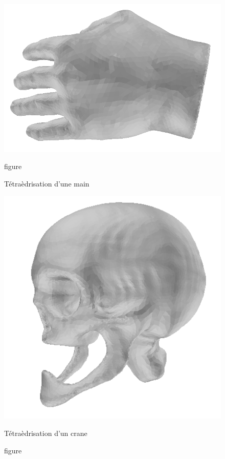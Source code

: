 \documentclass[a4paper,11pt,openany]{article}
\begin{document}
\begin{figure}[H]
\centering
\begin{minipage}{.5\textwidth}
  \centering
  \includegraphics[scale=0.2]{Images/hand}
  \caption{figure}{Tétraèdrisation d'une main}
  \label{fig:hand}
\end{minipage}%
\begin{minipage}{.5\textwidth}
  \centering
  \includegraphics[scale=0.2]{Images/skull}
  \caption{figure}{Tétraèdrisation d'un crane}
  \label{fig:skull}
\end{minipage}
\end{figure}
\end{document}

